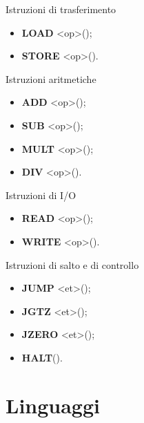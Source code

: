 \documentclass[10pt,a4paper]{article}
\begin{document}
\begin{multicols}{3}
\begin{textbox}{Istruzioni di trasferimento}
\begin{itemize}[leftmargin=*]
    \item \textbf{LOAD} <op>\quad();
    \item \textbf{STORE} <op>\quad().
\end{itemize}
\end{textbox}

\begin{textbox}{Istruzioni aritmetiche}
\begin{itemize}[leftmargin=*]
    \item \textbf{ADD} <op>\quad();
    \item \textbf{SUB} <op>\quad();
    \item \textbf{MULT} <op>\quad();
    \item \textbf{DIV} <op>\quad().
\end{itemize}
\end{textbox}

\begin{textbox}{Istruzioni di I/O}
\begin{itemize}[leftmargin=*]
    \item \textbf{READ} <op>\quad();
    \item \textbf{WRITE} <op>\quad().
\end{itemize}
\end{textbox}

\begin{textbox}{Istruzioni di salto e di controllo}
\begin{itemize}[leftmargin=*]
    \item \textbf{JUMP} <et>\quad();
    \item \textbf{JGTZ} <et>\quad();
    \item \textbf{JZERO} <et>\quad();
    \item \textbf{HALT}\quad().
\end{itemize}
\end{textbox}

\section{Linguaggi}


\end{multicols}
\end{document}

